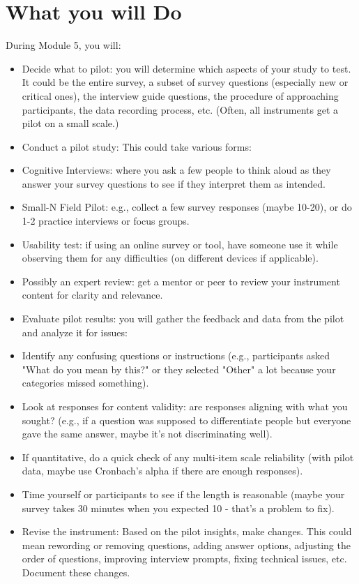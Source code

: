 \documentclass[10pt]{article}
\begin{document}
\section*{What you will Do}
During Module 5, you will:

\begin{itemize}
  \item Decide what to pilot: you will determine which aspects of your study to test. It could be the entire survey, a subset of survey questions (especially new or critical ones), the interview guide questions, the procedure of approaching participants, the data recording process, etc. (Often, all instruments get a pilot on a small scale.)
  \item Conduct a pilot study: This could take various forms:
  \item Cognitive Interviews: where you ask a few people to think aloud as they answer your survey questions to see if they interpret them as intended.
  \item Small-N Field Pilot: e.g., collect a few survey responses (maybe 10-20), or do 1-2 practice interviews or focus groups.
  \item Usability test: if using an online survey or tool, have someone use it while observing them for any difficulties (on different devices if applicable).
  \item Possibly an expert review: get a mentor or peer to review your instrument content for clarity and relevance.
  \item Evaluate pilot results: you will gather the feedback and data from the pilot and analyze it for issues:
  \item Identify any confusing questions or instructions (e.g., participants asked "What do you mean by this?" or they selected "Other" a lot because your categories missed something).
  \item Look at responses for content validity: are responses aligning with what you sought? (e.g., if a question was supposed to differentiate people but everyone gave the same answer, maybe it's not discriminating well).
  \item If quantitative, do a quick check of any multi-item scale reliability (with pilot data, maybe use Cronbach's alpha if there are enough responses).
  \item Time yourself or participants to see if the length is reasonable (maybe your survey takes 30 minutes when you expected 10 - that's a problem to fix).
  \item Revise the instrument: Based on the pilot insights, make changes. This could mean rewording or removing questions, adding answer options, adjusting the order of questions, improving interview prompts, fixing technical issues, etc. Document these changes.

\end{itemize}
\end{document}
